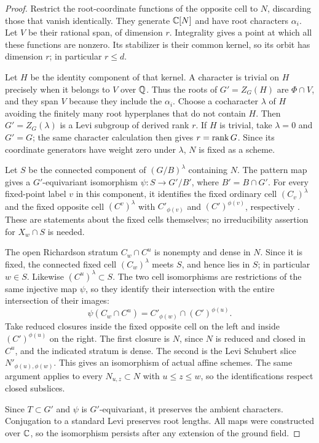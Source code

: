 \begin{proof}
Restrict the root-coordinate functions of the opposite cell to $N$, discarding those that vanish identically. They generate $\mathbb C[N]$ and have root characters $\alpha_i$. Let $V$ be their rational span, of dimension $r$. Integrality gives a point at which all these functions are nonzero. Its stabilizer is their common kernel, so its orbit has dimension $r$; in particular $r\le d$.

Let $H$ be the identity component of that kernel. A character is trivial on $H$ precisely when it belongs to $V$ over $\mathbb Q$. Thus the roots of $G'=Z_G(H)$ are $\Phi\cap V$, and they span $V$ because they include the $\alpha_i$. Choose a cocharacter $\lambda$ of $H$ avoiding the finitely many root hyperplanes that do not contain $H$. Then $G'=Z_G(\lambda)$ is a Levi subgroup of derived rank $r$. If $H$ is trivial, take $\lambda=0$ and $G'=G$; the same character calculation then gives $r=\operatorname{rank} G$. Since its coordinate generators have weight zero under $\lambda$, $N$ is fixed as a scheme.

Let $S$ be the connected component of $(G/B)^\lambda$ containing $N$. The pattern map gives a $G'$-equivariant isomorphism $\psi:S\longrightarrow G'/B'$, where $B'=B\cap G'$. For every fixed-point label $v$ in this component, it identifies the fixed ordinary cell $(C_v)^\lambda$ and the fixed opposite cell $(C^v)^\lambda$ with $C'_{\phi(v)}$ and $(C')^{\phi(v)}$, respectively \cite[Theorem~10]{BB03}\cite[Theorem~4.1 and the following paragraph]{Woo10}. These are statements about the fixed cells themselves; no irreducibility assertion for $X_w\cap S$ is needed.

The open Richardson stratum $C_w\cap C^u$ is nonempty and dense in $N$. Since it is fixed, the connected fixed cell $(C_w)^\lambda$ meets $S$, and hence lies in $S$; in particular $w\in S$. Likewise $(C^u)^\lambda\subset S$. The two cell isomorphisms are restrictions of the same injective map $\psi$, so they identify their intersection with the entire intersection of their images:
\[
 \psi(C_w\cap C^u)=C'_{\phi(w)}\cap(C')^{\phi(u)}.
\]
Take reduced closures inside the fixed opposite cell on the left and inside $(C')^{\phi(u)}$ on the right. The first closure is $N$, since $N$ is reduced and closed in $C^u$, and the indicated stratum is dense. The second is the Levi Schubert slice $N'_{\phi(u),\phi(w)}$. This gives an isomorphism of actual affine schemes. The same argument applies to every $N_{u,z}\subset N$ with $u\le z\le w$, so the identifications respect closed subslices.

Since $T\subset G'$ and $\psi$ is $G'$-equivariant, it preserves the ambient characters. Conjugation to a standard Levi preserves root lengths. All maps were constructed over $\mathbb C$, so the isomorphism persists after any extension of the ground field.
\end{proof}

